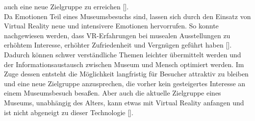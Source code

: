 \documentclass[a4paper,12pt,oneside]{article}
\begin{document}
        auch eine neue Zielgruppe zu erreichen [\cite[34-35]{Heidsiek2019}]. \\
        Da Emotionen Teil eines Museumsbesuchs sind, lassen sich durch den Einsatz
        von Virtual Reality neue und intensivere Emotionen hervorrufen.
        So konnte nachgewiesen werden, dass VR-Erfahrungen
        bei musealen Ausstellungen zu erhöhtem Interesse, erhöhter Zufriedenheit und 
        Vergnügen geführt haben [\cite[69-72]{Heidsiek2019}]. Dadurch können schwer
        verständliche Themen leichter übermittelt werden und der Informationsaustausch
        zwischen Museum und Mensch optimiert werden. 
        Im Zuge dessen entsteht die Möglichkeit langfristig für Besucher 
        attraktiv zu bleiben und eine neue Zielgruppe anzusprechen,
        die vorher kein gesteigertes Interesse an einem Museumsbesuch besaßen.
        Aber auch die aktuelle Zielgruppe eines Museums, unabhängig des Alters, kann
        etwas mit Virtual Reality anfangen und ist nicht abgeneigt zu dieser Technologie [\cite[75]{Heidsiek2019}].
\end{document}
